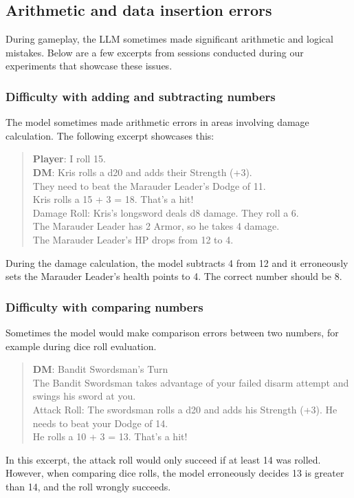 \documentclass[runningheads]{llncs}
\begin{document}
\subsection{Arithmetic and data insertion errors}
During gameplay, the LLM sometimes made significant arithmetic and logical mistakes. Below are a few excerpts from sessions conducted during our experiments that showcase these issues.

\subsubsection{Difficulty with adding and subtracting numbers}
The model sometimes made arithmetic errors in areas involving damage calculation. The following excerpt showcases this:
\begin{quote}
    \textbf{Player}: I roll 15.\\
    \textbf{DM}: Kris rolls a d20 and adds their Strength (+3).\\
    They need to beat the Marauder Leader’s Dodge of 11.\\
    Kris rolls a 15 + 3 = 18. That’s a hit!\\
    Damage Roll: Kris’s longsword deals d8 damage. They roll a 6. \\
    The Marauder Leader has 2 Armor, so he takes 4 damage.\\
    The Marauder Leader’s HP drops from 12 to 4.
\end{quote}
\noindent
During the damage calculation, the model subtracts 4 from 12 and it erroneously sets the Marauder Leader's health points to 4. The correct number should be 8.

\subsubsection{Difficulty with comparing numbers}
Sometimes the model would make comparison errors between two numbers, for example during dice roll evaluation.
\begin{quote}
    \textbf{DM}: Bandit Swordsman’s Turn\\
    The Bandit Swordsman takes advantage of your failed disarm 
    attempt and swings his sword at you.\\
    Attack Roll: The swordsman rolls a d20 and adds his Strength (+3). 
    He needs to beat your Dodge of 14.\\
    He rolls a 10 + 3 = 13. That’s a hit! 
\end{quote}
\noindent
In this excerpt, the attack roll would only succeed if at least 14 was rolled. However, when comparing dice rolls, the model erroneously decides 13 is greater than 14, and the roll wrongly succeeds. 
\end{document}
